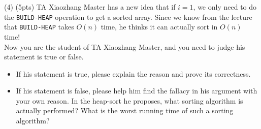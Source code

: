 \documentclass[10.5pt]{article}
\begin{document}

\newpage
(4) (5pts) TA Xiaozhang Master has a new idea that if $i = 1$, we only need to do the \texttt{BUILD-HEAP} operation to get a sorted array. Since we know from the lecture that \texttt{BUILD-HEAP} takes $O(n)$ time, he thinks it can actually sort in $O(n)$ time! \\

Now you are the student of TA Xiaozhang Master, and you need to judge his statement is true or false. 
\begin{itemize}
	\item{If his statement is true, please explain the reason and prove its correctness.}
	\item{If his statement is false, please help him find the fallacy in his argument with your own reason. In the heap-sort he proposes, what sorting algorithm is actually performed? What is the worst running time of such a sorting algorithm?}
\end{itemize}



























\end{document}
